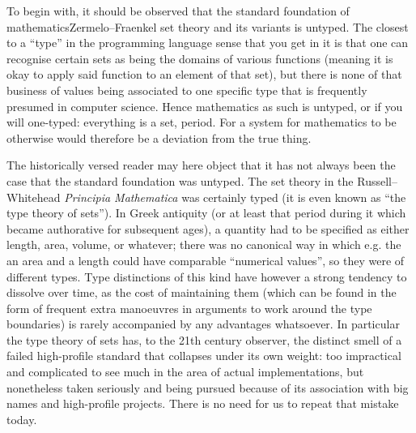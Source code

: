 \documentclass{mtmtcl}
\theoremstyle{plain}
\theoremstyle{remark}
\begin{document}
To begin with, it should be observed that the standard foundation of 
mathematics\Ldash Zermelo--Fraenkel set theory and its variants\Rdash 
is untyped. The closest to a ``type'' in the programming language sense 
that you get in it is that one can recognise certain sets as being 
the domains of various functions (meaning it is okay to apply said 
function to an element of that set), but there is none of that business of 
values being associated to one specific type that is frequently presumed 
in computer science. Hence mathematics as such is untyped, or if you 
will one-typed: everything is a set, period. For a system for mathematics 
to be otherwise would therefore be a deviation from the true thing.

The historically versed reader may here object that it has not always been 
the case that the standard foundation was untyped. The 
set theory in the Russell--Whitehead \emph{Principia Mathematica} was 
certainly typed (it is even known as ``the type theory of sets''). 
In Greek antiquity (or at least that period during it which became 
authorative for subsequent ages), a quantity had to be specified as 
either length, area, volume, or whatever; there was no canonical way in 
which e.g. the an area and a length could have comparable ``numerical 
values'', so they were of different types.
Type distinctions of this kind have however a strong tendency to dissolve 
over time, as the cost of maintaining them (which can be found in the 
form of frequent extra manoeuvres in arguments to work around the 
type boundaries) is rarely accompanied by any advantages whatsoever. 
In particular the type theory of sets has, to the 21th century observer, 
the distinct smell of a failed high-profile standard that collapses under 
its own weight: too impractical and complicated to see much in the area 
of actual implementations, but nonetheless taken seriously and being 
pursued because of its association with big names and high-profile 
projects. There is no need for us to repeat that mistake today.

\end{document}
